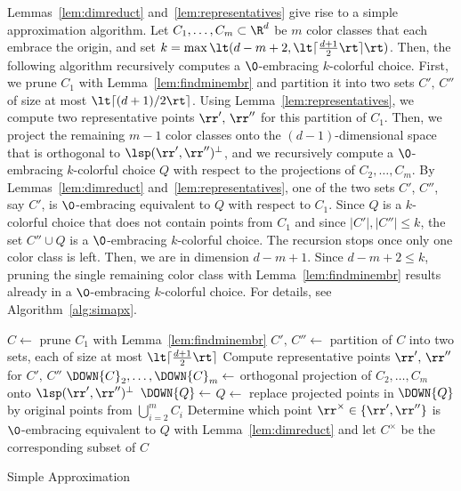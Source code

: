 Lemmas~\ref{lem:dimreduct} and~\ref{lem:representatives} give
rise to a simple approximation algorithm.
Let $C_1,\dots,C_m \subset \R^d$ be $m$ color classes
that each embrace the origin, and set $k=\max\lt(d-m+2,
\lt\lceil\frac{d+1}{2}\rt\rceil\rt)$. Then, the following algorithm 
recursively computes a $\0$-embracing $k$-colorful choice.
First, we prune $C_1$ with Lemma~\ref{lem:findminembr} and 
partition it into two sets
$C',\,C''$ of size at most $\lt\lceil
(d+1) / 2\rt\rceil$. Using Lemma~\ref{lem:representatives}, we compute two
representative points $\rr',\, \rr''$ for this partition of $C_1$.
Then, we project the remaining $m-1$ color classes onto the
$(d-1)$-dimensional space that is orthogonal to 
$\lsp(\rr',\rr'')^\perp$, and we recursively compute a 
$\0$-embracing $k$-colorful choice $Q$ with respect to
the projections of $C_2,\dots,C_m$. By Lemmas~\ref{lem:dimreduct}
and~\ref{lem:representatives}, one of the two sets $C'$, $C''$, 
say $C'$, is $\0$-embracing
equivalent to $Q$ with respect to $C_1$. Since $Q$ is a
$k$-colorful choice that does not contain points from $C_1$ and since
$|C'|,|C''|\leq k$, the set $C'' \cup Q$ is a $\0$-embracing $k$-colorful
choice. The recursion stops once only one color class is left. Then, 
we are in dimension $d-m+1$. Since $d-m+2 \leq k$, pruning the 
single remaining color class with
Lemma~\ref{lem:findminembr} results already in a $\0$-embracing 
$k$-colorful choice.  For details, see Algorithm~\ref{alg:simapx}.

\begin{alg}
  $C \gets $ prune $C_1$ with Lemma~\ref{lem:findminembr}\;
  $C',\, C'' \gets $ partition of $C$ into two sets, each of size at most
  $\lt\lceil\frac{d+1}{2}\rt\rceil$\;
  Compute representative points $\rr',\, \rr''$ for $C',\, C''$\;
  $\DOWN{C}_2, \dots, \DOWN{C}_m \gets$ orthogonal projection of
  $C_2,\dots,C_m$ onto $\lsp(\rr',\rr'')^\perp$\;
  $\DOWN{Q} \gets $ \;
  $Q \gets $ replace projected points in $\DOWN{Q}$ by original points from
  $\bigcup_{i=2}^m C_i$\;
  Determine which point $\rr^{\times} \in \{\rr',\rr''\}$ is $\0$-embracing
  equivalent to $Q$ with Lemma~\ref{lem:dimreduct} 
  and let $C^\times$ be the corresponding subset of $C$\;
  \;
  \caption[Computing $\0$-embracing $(\lceil d/2\rceil +1)$-colorful
  choices.]{Simple Approximation}
  \label{alg:simapx}
\end{alg}

